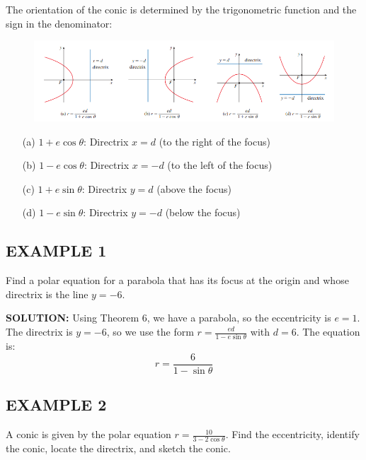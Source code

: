 \documentclass{article}
\begin{document}
The orientation of the conic is determined by the trigonometric function and the sign in the denominator:

\begin{figure}[htbp]
    \centering
    \includegraphics[width=1\textwidth]{graph 61.png}
\end{figure}

\begin{itemize}
    \item[(a)] $1 + e \cos\theta$: Directrix $x = d$ (to the right of the focus)
    \item[(b)] $1 - e \cos\theta$: Directrix $x = -d$ (to the left of the focus)
    \item[(c)] $1 + e \sin\theta$: Directrix $y = d$ (above the focus)
    \item[(d)] $1 - e \sin\theta$: Directrix $y = -d$ (below the focus)
\end{itemize}

\subsection*{EXAMPLE 1}
Find a polar equation for a parabola that has its focus at the origin and whose directrix is the line $y = -6$.

\textbf{SOLUTION:}
Using Theorem 6, we have a parabola, so the eccentricity is $e = 1$. The directrix is $y = -6$, so we use the form $r = \frac{ed}{1 - e \sin\theta}$ with $d = 6$. The equation is:
\[
r = \frac{6}{1 - \sin\theta}
\]

\subsection*{EXAMPLE 2}
A conic is given by the polar equation $r = \frac{10}{3 - 2 \cos\theta}$. Find the eccentricity, identify the conic, locate the directrix, and sketch the conic.
\end{document}
